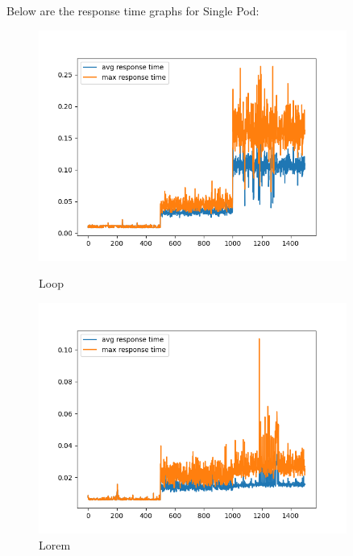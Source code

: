 \noindent Below are the response time graphs for Single Pod:

\begin{figure}[h]
    \begin{minipage}[t]{0.5\textwidth}
        \centering
        \includegraphics[width=0.9\textwidth]{../sample_results/loop/single-pod/response-time-single-pod-single-pod.png}
        \caption{Loop}
    \end{minipage}
    \hfill
    \begin{minipage}[t]{0.5\textwidth}
        \centering
        \includegraphics[width=0.9\textwidth]{../sample_results/lorem/single-pod/response-time-single-pod-single-pod.png}
        \caption{Lorem}
    \end{minipage}
\end{figure}

\newpage
